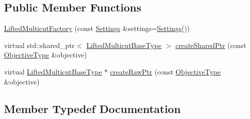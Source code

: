 \subsection*{Public Member Functions}
\begin{DoxyCompactItemize}
\item 
\hyperlink{classnifty_1_1graph_1_1lifted__multicut_1_1LiftedMulticutFactory_a8fb40ac3ae43d32a7e13d755b431e2ae}{Lifted\+Multicut\+Factory} (const \hyperlink{classnifty_1_1graph_1_1lifted__multicut_1_1LiftedMulticutFactory_a48e27ca10f95291da7b3a345c255ab6f}{Settings} \&settings=\hyperlink{classnifty_1_1graph_1_1lifted__multicut_1_1LiftedMulticutFactory_a48e27ca10f95291da7b3a345c255ab6f}{Settings}())
\item 
virtual std\+::shared\+\_\+ptr$<$ \hyperlink{classnifty_1_1graph_1_1lifted__multicut_1_1LiftedMulticutFactory_aa56d6140f798ec6bdf510ac80ddb7a0b}{Lifted\+Multicut\+Base\+Type} $>$ \hyperlink{classnifty_1_1graph_1_1lifted__multicut_1_1LiftedMulticutFactory_abfbd5a55919f999c153b041cfe96ca4b}{create\+Shared\+Ptr} (const \hyperlink{classnifty_1_1graph_1_1lifted__multicut_1_1LiftedMulticutFactory_aa8756716f99f691a6cff57d58bb71dd4}{Objective\+Type} \&objective)
\item 
virtual \hyperlink{classnifty_1_1graph_1_1lifted__multicut_1_1LiftedMulticutFactory_aa56d6140f798ec6bdf510ac80ddb7a0b}{Lifted\+Multicut\+Base\+Type} $\ast$ \hyperlink{classnifty_1_1graph_1_1lifted__multicut_1_1LiftedMulticutFactory_ab88e1997e8d7cea51b822616ad7c7312}{create\+Raw\+Ptr} (const \hyperlink{classnifty_1_1graph_1_1lifted__multicut_1_1LiftedMulticutFactory_aa8756716f99f691a6cff57d58bb71dd4}{Objective\+Type} \&objective)
\end{DoxyCompactItemize}


\subsection{Member Typedef Documentation}
\hypertarget{classnifty_1_1graph_1_1lifted__multicut_1_1LiftedMulticutFactory_aa56d6140f798ec6bdf510ac80ddb7a0b}{}
